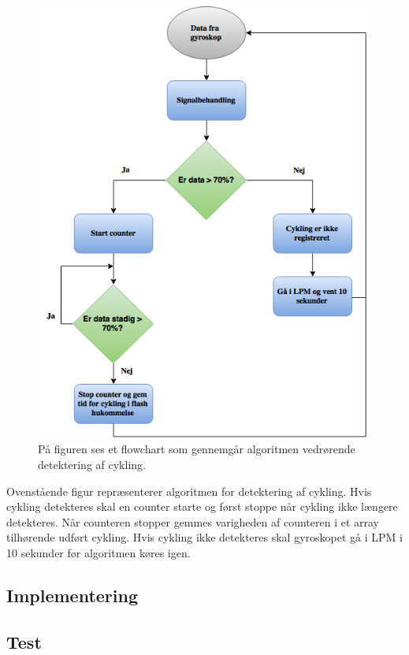 \begin{figure}[H]
	\centering
	\includegraphics[scale=0.6]{figures/cDesign/algoritme_cykling.png}
	\caption{På figuren ses et flowchart som gennemgår algoritmen vedrørende detektering af cykling.}
	\label{fig:algoritme_cykling}
\end{figure}

Ovenstående figur repræsenterer algoritmen for detektering af cykling. Hvis cykling detekteres skal en counter starte og først stoppe når cykling ikke længere detekteres. Når counteren stopper gemmes varigheden af counteren i et array tilhørende udført cykling. Hvis cykling ikke detekteres skal gyroskopet gå i LPM i 10 sekunder før algoritmen køres igen. 


\subsection{Implementering}




\subsection{Test}


